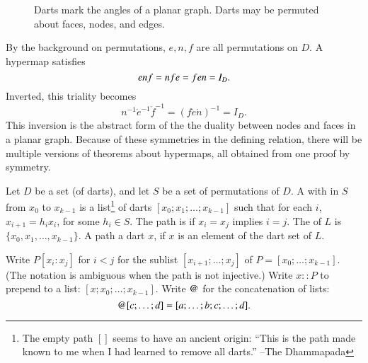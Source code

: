 \begin{figure}[htb]
\centering
{}
\caption{Darts mark the angles of a planar graph.  Darts may
be permuted about faces, nodes, and edges.}
\label{fig:hypermap_ex}
\end{figure}

By the background on permutations, $e,n,f$ are all permutations on $D$.
A hypermap satisfies 
\begin{equation}\tlabel{eqn:triality}
e \ocirc n\ocirc f = n\ocirc f\ocirc e = f\ocirc e\ocirc n = I_D.
\end{equation}
Inverted, this triality becomes
\begin{displaymath}
n^{-1} \ocirc e^{-1} \ocirc f^{-1} = (f \ocirc e \ocirc n)^{-1} = I_D.
\end{displaymath}
This inversion is the abstract form of the the duality between nodes
and faces in a planar graph.  Because of these symmetries in the
defining relation, there will be multiple versions of theorems about
hypermaps, all obtained from one proof by symmetry.


\begin{definition}[path] 
Let $D$ be a set (of darts), and let $S$ be a set of permutations of $D$.
A  with  in $S$
from $x_0$ to $x_{k-1}$ is a list\footnote{The empty path $[]$ seems
to have an ancient origin: ``This is the path made known to me
when I had learned to remove all darts.'' --The Dhammapada} of
darts $[x_0;x_1;\ldots;x_{k-1}]$ such that for each $i$, $x_{i+1} = h_i x_i$,
for some $h_i \in S$.    The
path is  if $x_i=x_j$ implies $i=j$. 
The  of $L$ is $\{x_0,x_1,\ldots,x_{k-1}\}$.  A path 
a dart $x$, if $x$ is an element of the dart set of $L$.
\end{definition}

\begin{notation}[$::$,~$\opat$]
Write $P[x_i:x_j]$ for $i<j$ for the sublist $[x_{i+1};\ldots;x_j]$ of
$P=[x_0;\ldots;x_{k-1}]$.  (The notation is ambiguous when the path is
not injective.)  Write $x::P$ to prepend to a list:
$[x;x_0;\ldots;x_{k-1}]$.  Write $\opat$ for the concatenation of
lists:
\begin{displaymath}
[a;\ldots;b] \opat [c;\ldots;d]  = [a;\ldots;b;c;\ldots;d].
\end{displaymath}
\end{notation}
%
%
%


